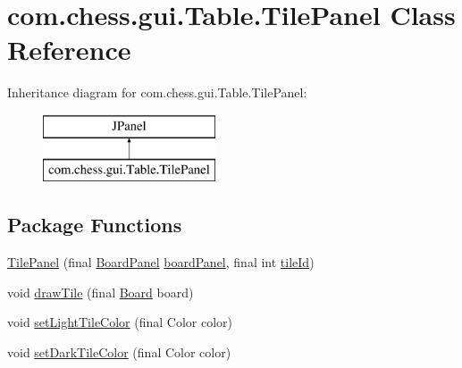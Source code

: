 \hypertarget{classcom_1_1chess_1_1gui_1_1_table_1_1_tile_panel}{}\section{com.\+chess.\+gui.\+Table.\+Tile\+Panel Class Reference}
\label{classcom_1_1chess_1_1gui_1_1_table_1_1_tile_panel}
Inheritance diagram for com.\+chess.\+gui.\+Table.\+Tile\+Panel\+:\begin{figure}[H]
\begin{center}
\leavevmode
\includegraphics[height=2.000000cm]{classcom_1_1chess_1_1gui_1_1_table_1_1_tile_panel}
\end{center}
\end{figure}
\subsection*{Package Functions}
\begin{DoxyCompactItemize}
\item 
\mbox{\hyperlink{classcom_1_1chess_1_1gui_1_1_table_1_1_tile_panel_a5866977e98811225c357972cae61650e}{Tile\+Panel}} (final \mbox{\hyperlink{classcom_1_1chess_1_1gui_1_1_table_1_1_board_panel}{Board\+Panel}} \mbox{\hyperlink{classcom_1_1chess_1_1gui_1_1_table_a141a17d073e1c874f7ac773a6a59fbd3}{board\+Panel}}, final int \mbox{\hyperlink{classcom_1_1chess_1_1gui_1_1_table_1_1_tile_panel_a0ff1e0f6414184421961bfa3f8e271fa}{tile\+Id}})
\item 
void \mbox{\hyperlink{classcom_1_1chess_1_1gui_1_1_table_1_1_tile_panel_a7baeab0cdad8dcc6087523eeff144b0f}{draw\+Tile}} (final \mbox{\hyperlink{classcom_1_1chess_1_1engine_1_1classic_1_1board_1_1_board}{Board}} board)
\item 
void \mbox{\hyperlink{classcom_1_1chess_1_1gui_1_1_table_1_1_tile_panel_aecd6ea783d7df0dc8269babd2502cdc1}{set\+Light\+Tile\+Color}} (final Color color)
\item 
void \mbox{\hyperlink{classcom_1_1chess_1_1gui_1_1_table_1_1_tile_panel_ae49982fa2e571d783bc3d0bd4bbd57ae}{set\+Dark\+Tile\+Color}} (final Color color)
\end{DoxyCompactItemize}
